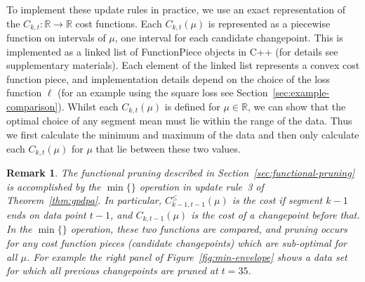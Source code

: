 \documentclass[aoas]{imsart}
\newtheorem{remark}{Remark}
\newcommand{\RR}{\mathbb R}
\begin{document}
To implement these update rules in practice, we use an exact
representation of the $C_{k,t}:\RR\rightarrow\RR$ cost functions. Each
$C_{k,t}(\mu)$ is represented as a piecewise function on intervals of
$\mu$, one interval for each candidate changepoint. This is
implemented as a linked list of FunctionPiece objects in C++ (for
details see supplementary materials). Each element of the linked list
represents a convex cost function piece, and implementation details
depend on the choice of the loss function $\ell$ (for an example using
the square loss see Section~\ref{sec:example-comparison}). Whilst each
$C_{k,t}(\mu)$ is defined for $\mu \in \RR$, we can show
that the optimal choice of any segment mean must lie within the range
of the data. Thus we first calculate the minimum and maximum of the
data and then only calculate each $C_{k,t}(\mu)$ for $\mu$ that lie
between these two values. 

\begin{remark}
  The functional pruning described in
  Section~\ref{sec:functional-pruning} is accomplished by the
  $\min\{\}$ operation in update rule~3 of Theorem~\ref{thm:gpdpa}. In
  particular, $C_{k-1,t-1}^\leq(\mu)$ is the cost if segment $k-1$
  ends on data point $t-1$, and $C_{k,t-1}(\mu)$ is the cost of a
  changepoint before that. In the $\min\{\}$ operation, these two
  functions are compared, and pruning occurs for any cost function
  pieces (candidate changepoints) which are sub-optimal for all $\mu$.
  For example the right panel of Figure~\ref{fig:min-envelope} shows a
  data set for which all previous changepoints are pruned at $t=35$.
\end{remark}
\end{document}
